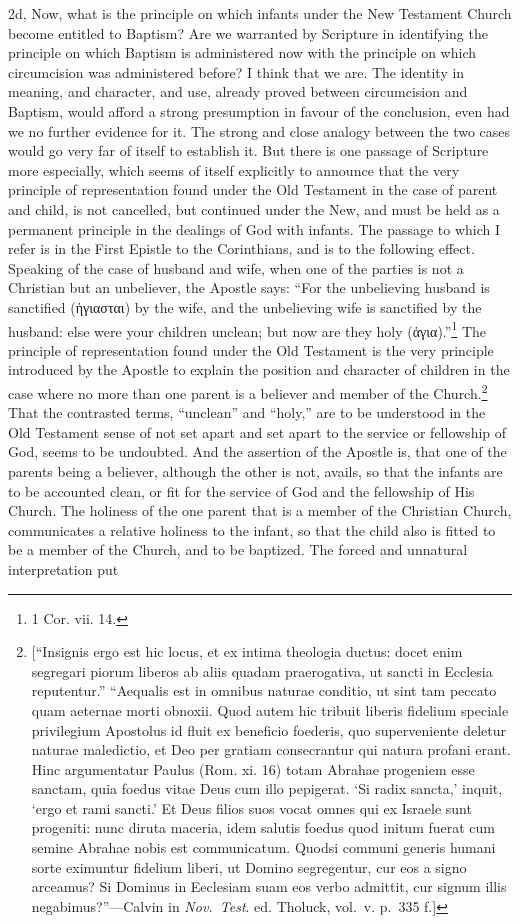 \documentclass[]{book}
\begin{document}
2d, Now, what is the principle on which infants under the New Testament Church become entitled to Baptism? Are we warranted by Scripture in identifying the principle on which Baptism is administered now with the principle on which circumcision was administered before? I think that we are. The identity in meaning, and character, and use, already proved between circumcision and Baptism, would afford a strong presumption in favour of the conclusion, even had we no further evidence for it. The strong and close analogy between the two cases would go very far of itself to establish it. But there is one passage of Scripture more especially, which seems of itself explicitly to announce that the very principle of representation found under the Old Testament in the case of parent and child, is not cancelled, but continued under the New, and must be held as a permanent principle in the dealings of God with infants. The passage to which I refer is in the First Epistle to the Corinthians, and is to the following effect. Speaking of the case of husband and wife, when one of the parties is not a Christian but an unbeliever, the Apostle says: ``For the unbelieving husband is sanctified (ἡγιασται) by the wife, and the unbelieving wife is sanctified by the husband: else were your children unclean; but now are they holy (ἁγια).''\footnote{1 Cor. vii. 14.} The principle of representation found under the Old Testament is the very principle introduced by the Apostle to explain the position and character of children in the case where no more than one parent is a believer and member of the Church.\footnote{{[}``Insignis ergo est hic locus, et ex intima theologia ductus: docet enim segregari piorum liberos ab aliis quadam praerogativa, ut sancti in Ecclesia reputentur.'' ``Aequalis est in omnibus naturae conditio, ut sint tam peccato quam aeternae morti obnoxii. Quod autem hic tribuit liberis fidelium speciale privilegium Apostolus id fluit ex beneficio foederis, quo superveniente deletur naturae maledictio, et Deo per gratiam consecrantur qui natura profani erant. Hinc argumentatur Paulus (Rom. xi. 16) totam Abrahae progeniem esse sanctam, quia foedus vitae Deus cum illo pepigerat. `Si radix sancta,' inquit, `ergo et rami sancti.' Et Deus filios suos vocat omnes qui ex Israele sunt progeniti: nunc diruta maceria, idem salutis foedus quod initum fuerat cum semine Abrahae nobis est communicatum. Quodsi communi generis humani sorte eximuntur fidelium liberi, ut Domino segregentur, cur eos a signo arceamus? Si Dominus in Eeclesiam suam eos verbo admittit, cur signum illis negabimus?''---Calvin in \emph{Nov.~Test}. ed. Tholuck, vol.~v. p.~335 f.{]}} That the contrasted terms, ``unclean'' and ``holy,'' are to be understood in the Old Testament sense of not set apart and set apart to the service or fellowship of God, seems to be undoubted. And the assertion of the Apostle is, that one of the parents being a believer, although the other is not, avails, so that the infants are to be accounted clean, or fit for the service of God and the fellowship of His Church. The holiness of the one parent that is a member of the Christian Church, communicates a relative holiness to the infant, so that the child also is fitted to be a member of the Church, and to be baptized. The forced and unnatural interpretation put 
\end{document}
